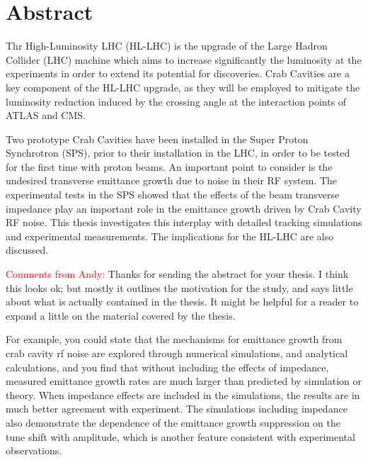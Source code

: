 \cleardoublepage
\chapter*{Abstract}


Thr High-Luminosity LHC (HL-LHC) is the upgrade of the Large Hadron Collider (LHC)  machine which aims to increase significantly the luminosity at the experiments in order to extend its potential for discoveries. Crab Cavities are a key component of the HL-LHC upgrade, as they will be employed to mitigate the luminosity reduction induced by the crossing angle at the interaction points of ATLAS and CMS. 


Two prototype Crab Cavities have been installed in the Super Proton Synchrotron (SPS), prior to their installation in the LHC, in order to be tested for the first time with proton beams. An important point to consider is the undesired transverse emittance growth due to noise in their RF system. The experimental tests in the SPS showed that the effects of the beam transverse impedance play an important role in the emittance growth driven by Crab Cavity RF noise. This thesis investigates this interplay with detailed tracking simulations and experimental measurements. The implications for the HL-LHC are also discussed.


\textcolor{red}{Comments from Andy:}
Thanks for sending the abstract for your thesis.  I think this looks ok; but mostly it outlines the motivation for the study, and says little about what is actually contained in the thesis.  It might be helpful for a reader to expand a little on the material covered by the thesis. 


For example, you could state that the mechanisms for emittance growth from crab cavity rf noise are explored through numerical simulations, and analytical calculations, and you find that without including the effects of impedance, measured emittance growth rates are much larger than predicted by simulation or theory.  When impedance effects are included in the simulations, the results are in much better agreement with experiment.  The simulations including impedance also demonstrate the dependence of the emittance growth suppression on the tune shift with amplitude, which is another feature consistent with experimental observations.

 


